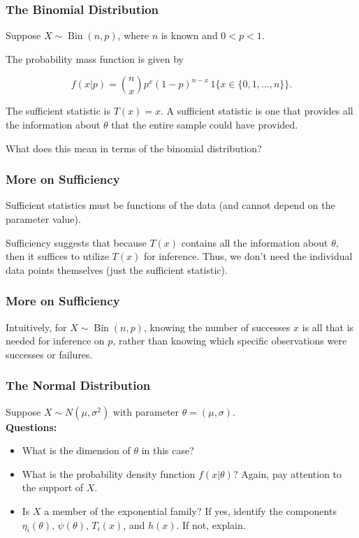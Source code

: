 \documentclass{beamer}
\begin{document}
\begin{frame}
\frametitle{The Binomial Distribution}
Suppose $X \sim \operatorname{Bin}(n,p)$, where $n$ is known and $0 < p < 1$.

The probability mass function is given by 

$$f(x|p) = \binom{n}{x} p^x (1-p)^{n-x} \, 1\{x \in \{0,1,\dots,n\}\}.$$
\vspace*{1em}

The sufficient statistic is $T(x) = x.$ A sufficient statistic is one that provides all the information about $\theta$ that the entire sample could have provided. 
\vspace*{1em}

What does this mean in terms of the binomial distribution?
\end{frame}

\begin{frame}
\frametitle{More on Sufficiency}
Sufficient statistics must be functions of the data (and cannot depend on the parameter value). 

\vspace*{1em}

Sufficiency suggests that because $T(x)$ contains all the information about $\theta,$ then it suffices to utilize $T(x)$ for inference. Thus, we don't need the individual data points themselves (just the sufficient statistic). 
\end{frame}


\begin{frame}
\frametitle{More on Sufficiency}
Intuitively, for $X \sim \operatorname{Bin}(n,p)$, knowing the number of successes $x$ is all that is needed for inference on $p$, rather than knowing which specific observations were successes or failures.
\end{frame}

\begin{frame}
\frametitle{The Normal Distribution}
Suppose $X \sim N(\mu, \sigma^2)$ with parameter $\theta=(\mu,\sigma)$.\\[1em]
\textbf{Questions:}
\begin{itemize}
  \item What is the dimension of $\theta$ in this case?
  \item What is the probability density function $f(x|\theta)$? Again, pay attention to the support of $X.$
  \item Is $X$ a member of the exponential family? If yes, identify the components $\eta_i(\theta)$, $\psi(\theta)$, $T_i(x)$, and $h(x)$. If not, explain.
\end{itemize}
\end{frame}
\end{document}
